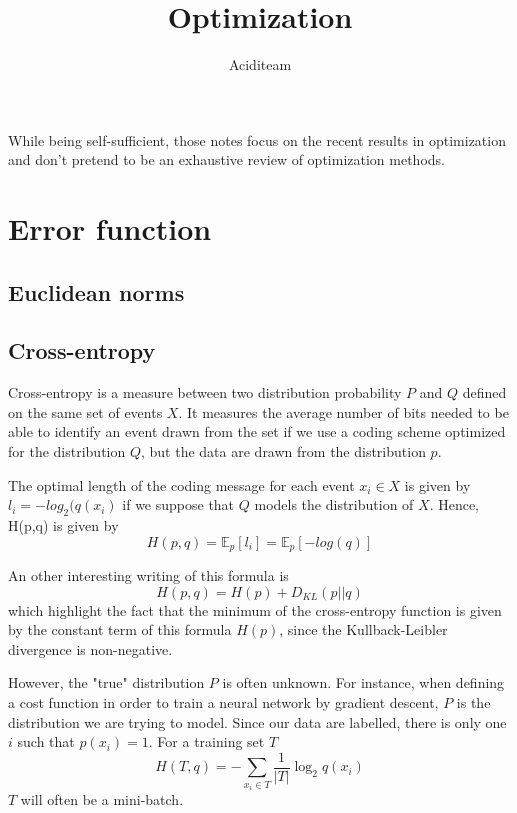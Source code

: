 \documentclass{report}
\title{Optimization}
\author{Aciditeam}
\begin{document}
\maketitle
While being self-sufficient, those notes focus on the recent results in optimization and don't pretend to be an exhaustive review of optimization methods.

\chapter{Error function}
\section{Euclidean norms}
\section{Cross-entropy}
Cross-entropy is a measure between two distribution probability $P$ and $Q$ defined on the same set of events $X$. It measures the average number of bits needed to be able to identify an event drawn from the set if we use a coding scheme optimized for the distribution $Q$, but the data are drawn from the distribution $p$.

The optimal length of the coding message for each event $x_i \in X$  is given by $l_{i} = -log_{2} (q(x_{i})$ if we suppose that $Q$ models the distribution of $X$.
Hence, H(p,q) is given by
\begin{equation}
H(p,q) = \mathbb{E}_{p} \left[ l_{i} \right] = \mathbb{E}_{p} \left[ - log(q) \right]
\end{equation}

An other interesting writing of this formula is
\begin{equation}
H(p,q) = H(p) + D_{KL}(p||q)
\end{equation}
which highlight the fact that the minimum of the cross-entropy function is given by the constant term of this formula $H(p)$, since the Kullback-Leibler divergence is non-negative.

However, the "true" distribution $P$ is often unknown. For instance, when defining a cost function in order to train a neural network by gradient descent, $P$ is the distribution we are trying to model.
Since our data are labelled, there is only one $i$ such that $p(x_{i}) = 1$.
For a training set $T$
\begin{equation}
\hat{H}(T,q) = - \sum_{x_{i} \in T} \frac{1}{| T |} \log _2 q(x_{i})
\end{equation}
$T$ will often be a mini-batch.
\end{document}
